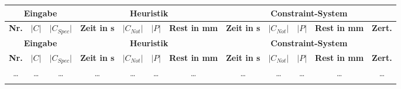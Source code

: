 \begin{landscape}
        \begin{longtable}{|c|c|c||c|c|c|c||c|c|c|c|c|}
                \hline
                \multicolumn{3}{|c||}{\textbf{Eingabe}} & \multicolumn{4}{c||}{\textbf{Heuristik}} & \multicolumn{5}{c|}{\textbf{Constraint-System}} \\
                \hline
                \textbf{Nr.} & \textbf{$\lvert C \rvert$} & \textbf{$\lvert C_{Spec} \rvert$} & \textbf{Zeit in s} & \textbf{$\lvert C_{Not} \rvert$} & \textbf{$\lvert P \rvert$} & \textbf{Rest in mm} & \textbf{Zeit in s} & \textbf{$\lvert C_{Not} \rvert$} & \textbf{$\lvert P \rvert$} & \textbf{Rest in mm} & \textbf{Zert.} \\
                \hline
                \endfirsthead

                \hline
                \multicolumn{3}{|c||}{\textbf{Eingabe}} & \multicolumn{4}{c||}{\textbf{Heuristik}} & \multicolumn{5}{c|}{\textbf{Constraint-System}} \\
                \hline
                \textbf{Nr.} & \textbf{$\lvert C \rvert$} & \textbf{$\lvert C_{Spec} \rvert$} & \textbf{Zeit in s} & \textbf{$\lvert C_{Not} \rvert$} & \textbf{$\lvert P \rvert$} & \textbf{Rest in mm} & \textbf{Zeit in s} & \textbf{$\lvert C_{Not} \rvert$} & \textbf{$\lvert P \rvert$} & \textbf{Rest in mm} & \textbf{Zert.} \\
                \hline
                \endhead

                \ldots       & \ldots     & \ldots     & \ldots      & \ldots     & \ldots     & \ldots     & \ldots     & \ldots     & \ldots     & \ldots            & \ldots \\
                \endfoot

                \endlastfoot


\end{longtable}
\end{landscape}
